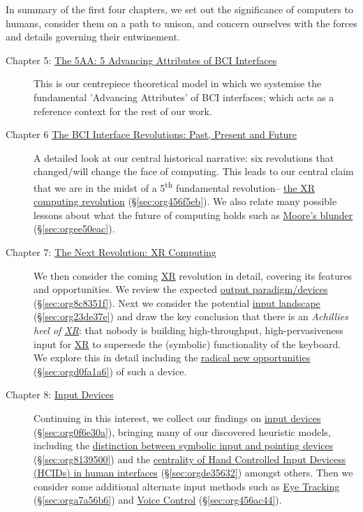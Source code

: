 \documentclass[logo,bsc,singlespacing,parskip]{infthesis}
\begin{document}
In summary of the first four chapters, we set out the significance of computers to humans, consider them on a path to unison, and concern ourselves with the forces and details governing their entwinement.

\begin{description}
\item[{Chapter 5: \hyperref[sec:orgb0e25d2]{The 5AA: 5 Advancing Attributes of BCI Interfaces}}] This is our centrepiece theoretical model in which we systemise the fundamental 'Advancing Attributes' of BCI interfaces; which acts as a reference context for the rest of our work.

\item[{Chapter 6 \hyperref[sec:orgac8b15e]{The BCI Interface Revolutions: Past, Present and Future}}] A detailed look at our central historical narrative: six revolutions that changed/will change the face of computing.
This leads to our central claim that we are in the midst of a 5\textsuperscript{th} fundamental revolution-- \hyperref[sec:org456f5eb]{the XR computing revolution} (\S \ref{sec:org456f5eb}).
We also relate many possible lessons about what the future of computing holds such as \hyperref[sec:orgee50eac]{Moore's blunder} (\S \ref{sec:orgee50eac}).

\item[{Chapter 7: \hyperref[sec:org3989e0b]{The Next Revolution: XR Computing}}] We then consider the coming \hyperref[orgf7f8e78]{XR} revolution in detail, covering its features and opportunities.
We review the expected \hyperref[sec:org8c8351f]{output paradigm/devices} (\S \ref{sec:org8c8351f}).
Next we consider the potential \hyperref[sec:org23de37e]{input landscape} (\S \ref{sec:org23de37e}) and draw the key conclusion that there is an \emph{Achillies heel of \hyperref[orgf7f8e78]{XR}}: that nobody is building high-throughput, high-pervasiveness input for \hyperref[orgf7f8e78]{XR} to supersede the (symbolic) functionality of the keyboard.
We explore this in detail including the \hyperref[sec:orgd0fa1a6]{radical new opportunities} (\S \ref{sec:orgd0fa1a6}) of such a device.

\item[{Chapter 8: \hyperref[sec:org0f6e30a]{Input Devices}}] Continuing in this interest, we collect our findings on \hyperref[sec:org0f6e30a]{input devices} (\S \ref{sec:org0f6e30a}), bringing many of our discovered heuristic models, including the \hyperref[sec:org8139500]{distinction between symbolic input and pointing devices} (\S \ref{sec:org8139500}) and the \hyperref[sec:orgde35632]{centrality of Hand Controlled Input Devicess (HCIDs) in human interfaces} (\S \ref{sec:orgde35632}) amongst others.
Then we consider some additional alternate input methods such as \hyperref[sec:orga7a56b6]{Eye Tracking} (\S \ref{sec:orga7a56b6}) and \hyperref[sec:org456ac44]{Voice Control} (\S \ref{sec:org456ac44}).


\end{description}
\end{document}
